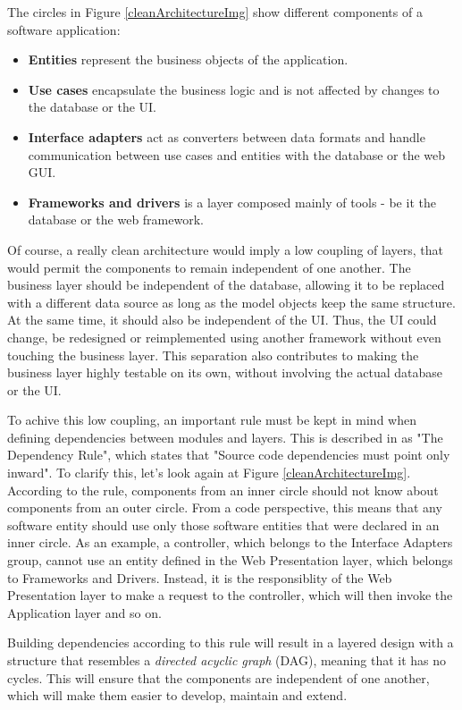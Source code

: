 The circles in Figure \ref{cleanArchitectureImg} show different components of a software application:

\begin{itemize}
  \item \textbf{Entities} represent the business objects of the application.
  \item \textbf{Use cases} encapsulate the business logic and is not affected by changes to the database or the UI.
  \item \textbf{Interface adapters} act as converters between data formats and handle communication between use cases and entities with the database or the web GUI.
  \item \textbf{Frameworks and drivers} is a layer composed mainly of tools - be it the database or the web framework.
\end{itemize}

Of course, a really clean architecture would imply a low coupling of layers, that would permit the components to remain independent of one another. The business layer should be independent of the database, allowing it to be replaced with a different data source as long as the model objects keep the same structure. At the same time, it should also be independent of the UI. Thus, the UI could change, be redesigned or reimplemented using another framework without even touching the business layer. This separation also contributes to making the business layer highly testable on its own, without involving the actual database or the UI.

To achive this low coupling, an important rule must be kept in mind when defining dependencies between modules and layers. This is described in \cite{cleanArchitecture} as "The Dependency Rule", which states that "Source code dependencies must point only inward". To clarify this, let's look again at Figure \ref{cleanArchitectureImg}. According to the rule, components from an inner circle should not know about components from an outer circle. From a code perspective, this means that any software entity should use only those software entities that were declared in an inner circle. As an example, a controller, which belongs to the Interface Adapters group, cannot use an entity defined in the Web Presentation layer, which belongs to Frameworks and Drivers. Instead, it is the responsiblity of the Web Presentation layer to make a request to the controller, which will then invoke the Application layer and so on.

Building dependencies according to this rule will result in a layered design with a structure that resembles a \textit{directed acyclic graph} (DAG), meaning that it has no cycles. This will ensure that the components are independent of one another, which will make them easier to develop, maintain and extend.


